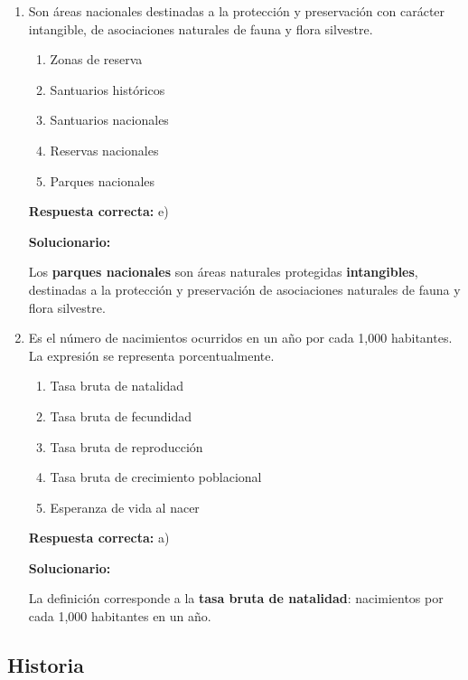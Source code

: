 \begin{enumerate}[resume]


\item Son áreas nacionales destinadas a la protección y preservación con carácter intangible, de asociaciones naturales de fauna y flora silvestre.
\begin{enumerate}[label=\alph*)]
	\item Zonas de reserva
	\item Santuarios históricos
	\item Santuarios nacionales
	\item Reservas nacionales
	\item Parques nacionales
\end{enumerate}

\textbf{Respuesta correcta:} e)

\vspace{2mm}
\textbf{Solucionario:}

Los \textbf{parques nacionales} son áreas naturales protegidas \textbf{intangibles}, destinadas a la protección y preservación de asociaciones naturales de fauna y flora silvestre.

\item  Es el número de nacimientos ocurridos en un año por cada 1,000 habitantes. La expresión se representa porcentualmente.
\begin{enumerate}[label=\alph*)]
	\item Tasa bruta de natalidad
	\item Tasa bruta de fecundidad
	\item Tasa bruta de reproducción
	\item Tasa bruta de crecimiento poblacional
	\item Esperanza de vida al nacer
\end{enumerate}

\textbf{Respuesta correcta:} a)

\vspace{2mm}
\textbf{Solucionario:}

La definición corresponde a la \textbf{tasa bruta de natalidad}: nacimientos por cada 1,000 habitantes en un año.




\end{enumerate}







\subsection*{Historia}

